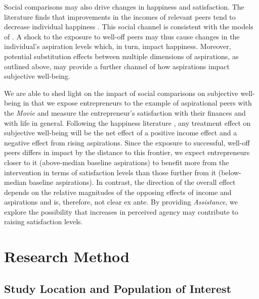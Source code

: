 \documentclass[11.5pt]{article}
\begin{document}
Social comparisons may also drive changes in happiness and satisfaction. The literature finds that improvements in the incomes of relevant peers tend to decrease individual happiness \citep[e.g.,][]{Clark2010, Fafchamps2008, Luttmer2005, Ferrer-i-Carbonell2005, Stutzer2004, Senik2004, Senik2009}. This social channel is consistent with the models of \citep{Ray2006, Genicot2017, Janzen2017}. A shock to the exposure to well-off peers may thus cause changes in the individual's aspiration levels which, in turn, impact happiness. Moreover, potential substitution effects between multiple dimensions of aspirations, as outlined above, may provide a further channel of how aspirations impact subjective well-being.

We are able to shed light on the impact of social comparisons on subjective well-being in that we expose entrepreneurs to the example of aspirational peers with the \emph{Movie} and measure the entrepreneur's satisfaction with their finances and with life in general. Following the happiness literature \citep[e.g.,][]{Easterlin1995, Easterlin2001, Easterlin2003, Clark2008, Frey2002}, any treatment effect on subjective well-being will be the net effect of a positive income effect and a negative effect from rising aspirations. Since the exposure to successful, well-off peers differs in impact by the distance to this frontier, we expect entrepreneurs closer to it (above-median baseline aspirations) to benefit more from the intervention in terms of satisfaction levels than those further from it (below-median baseline aspirations). In contrast, the direction of the overall effect depends on the relative magnitudes of the opposing effects of income and aspirations and is, therefore, not clear ex ante. By providing \emph{Assistance}, we explore the possibility that increases in perceived agency may contribute to raising satisfaction levels.


\section{\textbf{Research Method}}\label{sec.method}


\subsection{Study Location and Population of Interest}
\end{document}

